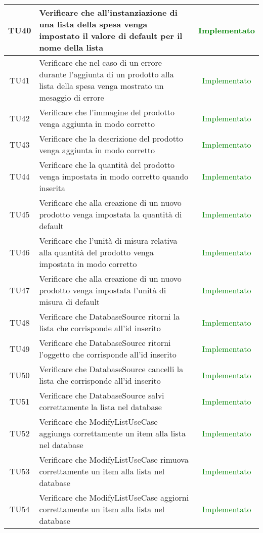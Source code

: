 \begin{center}
\begin{longtable}{|c|>{\centering}m{10cm}|c|}
		TU40 & Verificare che all'instanziazione di una lista della spesa venga impostato il valore di default per il nome della lista & \textcolor{Green}{Implementato}\\ \hline
		TU41 & Verificare che nel caso di un errore durante l'aggiunta di un prodotto alla lista della spesa venga mostrato un mesaggio di errore & \textcolor{Green}{Implementato}\\ \hline
		TU42 & Verificare che l'immagine del prodotto venga aggiunta in modo corretto & \textcolor{Green}{Implementato}\\ \hline
		TU43 & Verificare che la descrizione del prodotto venga aggiunta in modo corretto & \textcolor{Green}{Implementato}\\ \hline
		TU44 & Verificare che la quantità del prodotto venga impostata in modo corretto quando inserita & \textcolor{Green}{Implementato}\\ \hline
		TU45 & Verificare che alla creazione di un nuovo prodotto venga impostata la quantità di default & \textcolor{Green}{Implementato}\\ \hline
		TU46 & Verificare che l'unità di misura relativa alla quantità del prodotto venga impostata in modo corretto & \textcolor{Green}{Implementato}\\ \hline
		TU47 & Verificare che alla creazione di un nuovo prodotto venga impostata l'unità di misura di default & \textcolor{Green}{Implementato}\\ \hline
		TU48 & Verificare che DatabaseSource ritorni la lista che corrisponde all'id inserito & \textcolor{Green}{Implementato}\\ \hline
		TU49 & Verificare che DatabaseSource ritorni l'oggetto che corrisponde all'id inserito & \textcolor{Green}{Implementato}\\ \hline
		TU50 & Verificare che DatabaseSource cancelli la lista che corrisponde all'id inserito & \textcolor{Green}{Implementato}\\ \hline
		TU51 & Verificare che DatabaseSource salvi correttamente la lista nel database & \textcolor{Green}{Implementato}\\ \hline
		TU52 & Verificare che ModifyListUseCase aggiunga correttamente un item alla lista nel database & \textcolor{Green}{Implementato}\\ \hline
		TU53 & Verificare che ModifyListUseCase rimuova correttamente un item alla lista nel database & \textcolor{Green}{Implementato}\\ \hline
		TU54 & Verificare che ModifyListUseCase aggiorni correttamente un item alla lista nel database & \textcolor{Green}{Implementato}\\ \hline

\end{longtable}
\end{center}
